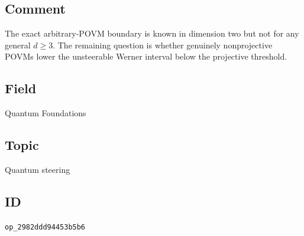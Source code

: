 \subsection*{Comment}

The exact arbitrary-POVM boundary is known in dimension two but not for any
general $d\geq3$.  The remaining question is whether genuinely
nonprojective POVMs lower the unsteerable Werner interval below the
projective threshold.

\subsection*{Field}

Quantum Foundations

\subsection*{Topic}

Quantum steering

\subsection*{ID}

\texttt{op\_2982ddd94453b5b6}
